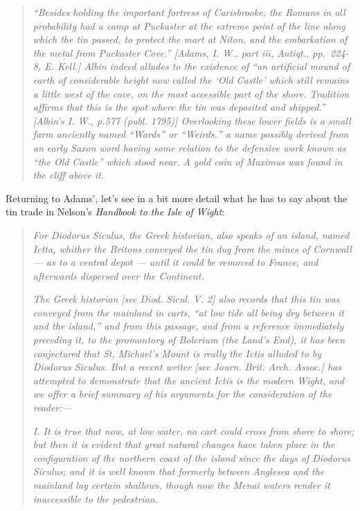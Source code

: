 \documentclass[
  12pt,
  a5paper,
  twoside]{book}
\begin{document}
\begin{quote}
\emph{``Besides holding the important fortress of Carisbrooke, the
Romans in all probability had a camp at Puckaster at the extreme point
of the line along which the tin passed, to protect the mart at Niton,
and the embarkation of the metal from Puckaster Cove.'' {[}Adams, I. W.,
part iii, Antiqt., pp.~224-8, E. Kell.{]} Albin indeed alludes to the
existence of ``an artificial mound of earth of considerable height now
called the `Old Castle' which still remains a little west of the cove,
on the most accessible part of the shore. Tradition affirms that this is
the spot where the tin was deposited and shipped.'' {[}Albin's I. W.,
p.577 (publ. 1795){]} Overlooking these lower fields is a small farm
anciently named ``Wards'' or ``Weirds,'' a name possibly derived from an
early Saxon word having some relation to the defensive work known as
``the Old Castle'' which stood near. A gold coin of Maximus was found in
the cliff above it.}
\end{quote}

Returning to Adams', let's see in a bit more detail what he has to say
about the tin trade in Nelson's \emph{Handbook to the Isle of Wight}:

\begin{quote}
\emph{For Diodorus Siculus, the Greek historian, also speaks of an
island, named Ictta, whither the Britons conveyed the tin dug from the
mines of Cornwall --- as to a central depot --- until it could be
removed to France, and afterwards dispersed over the Continent.}

\emph{The Greek historian {[}see Diod. Sicul. V. 2{]} also records that
this tin was conveyed from the mainland in carts, ``at low tide all
being dry between it and the island,'' and from this passage, and from a
reference immediately preceding it, to the promontory of Bolerium (the
Land's End), it has been conjectured that St, Michael's Mount is really
the Ictis alluded to by Diodorus Siculus. But a recent writer {[}see
Journ. Brit. Arch. Assoc.{]} has attempted to demonstrate that the
ancient Ictis is the modern Wight, and we offer a brief summary of his
arguments for the consideration of the reader:---}

\emph{I. It is true that now, at low water, no cart could cross from
shore to shore; but then it is evident that great natural changes have
taken place in the configuration of the northern coast of the island
since the days of Diodorus Siculus; and it is well known that formerly
between Anglesea and the mainland lay certain shallows, though now the
Menai waters render it inaccessible to the pedestrian.}
\end{quote}
\end{document}
